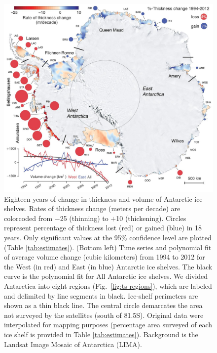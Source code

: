 \begin{figure}[!h]
  \centering
  \includegraphics[width=\textwidth]{img/Fig1_dzdt_map_final.jpg}
  \caption[Eighteen years of change in thickness and volume]{
  \ssp \footnotesize
  Eighteen years of change in thickness and volume of Antarctic
  ice shelves. Rates of thickness change (meters per decade) are colorcoded
  from $-$25 (thinning) to $+$10 (thickening). Circles represent percentage of
  thickness lost (red) or gained (blue) in 18 years. Only significant values at
  the 95\% confidence level are plotted (Table \ref{tab:estimates}). (Bottom left)
  Time series and polynomial fit of average volume change (cubic kilometers)
  from 1994 to 2012 for the West (in red) and East (in blue) Antarctic ice
  shelves. The black curve is the polynomial fit for All Antarctic ice shelves.
  We divided Antarctica into eight regions (Fig.~\ref{fig:ts-regions}), which are labeled
  and delimited by line segments in black. Ice-shelf perimeters are shown as a
  thin black line. The central circle demarcates the area not surveyed by the
  satellites (south of 81.5\degree S). Original data were interpolated for
  mapping purposes (percentage area surveyed of each ice shelf is provided in
  Table \ref{tab:estimates}). Background is the Landsat Image Mosaic of Antarctica
  (LIMA).}
  \label{fig:ice-shelf-change}
\end{figure}
\clearpage


